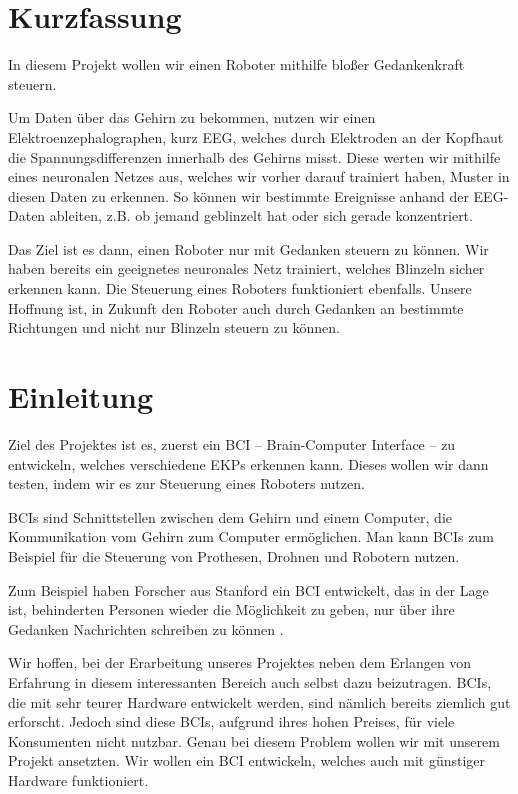 \documentclass[11pt]{scrartcl}
\begin{document}
	\newpage

	
	\tableofcontents
	
	\newpage

	\section{Kurzfassung}


	In diesem Projekt wollen wir einen Roboter mithilfe bloßer Gedankenkraft steuern.

	Um Daten über das Gehirn zu bekommen, nutzen wir einen Elektroenzephalographen, kurz EEG, welches durch Elektroden an der Kopfhaut die Spannungsdifferenzen innerhalb des Gehirns misst. Diese werten wir mithilfe eines neuronalen Netzes aus, welches wir vorher darauf trainiert haben, Muster in diesen Daten zu erkennen. So können wir bestimmte Ereignisse anhand der EEG-Daten ableiten, z.B. ob jemand geblinzelt hat oder sich gerade konzentriert.
	
	Das Ziel ist es dann, einen Roboter nur mit Gedanken steuern zu können.
	Wir haben bereits ein geeignetes neuronales Netz trainiert, welches Blinzeln sicher erkennen kann. Die Steuerung eines Roboters funktioniert ebenfalls.
	Unsere Hoffnung ist, in Zukunft den Roboter auch durch Gedanken an bestimmte Richtungen und nicht nur Blinzeln steuern zu können.

	\section{Einleitung}

	Ziel des Projektes ist es, zuerst ein BCI -- Brain-Computer Interface -- zu entwickeln, welches verschiedene EKPs erkennen kann. Dieses wollen wir dann testen, indem wir es zur Steuerung eines Roboters nutzen.

	BCIs sind Schnittstellen zwischen dem Gehirn und einem Computer, die Kommunikation vom Gehirn zum Computer ermöglichen. Man kann BCIs zum Beispiel für die Steuerung von Prothesen, Drohnen und Robotern nutzen. \cite{bci-explained}

	Zum Beispiel haben Forscher aus Stanford ein BCI entwickelt, das in der Lage ist, behinderten Personen wieder die Möglichkeit zu geben, nur über ihre Gedanken Nachrichten schreiben zu können \cite{brain2text}.
	
	Wir hoffen, bei der Erarbeitung unseres Projektes neben dem Erlangen von Erfahrung in diesem interessanten Bereich auch selbst dazu beizutragen. BCIs, die mit sehr teurer Hardware entwickelt werden, sind nämlich bereits ziemlich gut erforscht. Jedoch sind diese BCIs, aufgrund ihres hohen Preises, für viele Konsumenten nicht nutzbar. Genau bei diesem Problem wollen wir mit unserem Projekt ansetzten. Wir wollen ein BCI entwickeln, welches auch mit günstiger Hardware funktioniert.
	
\end{document}
